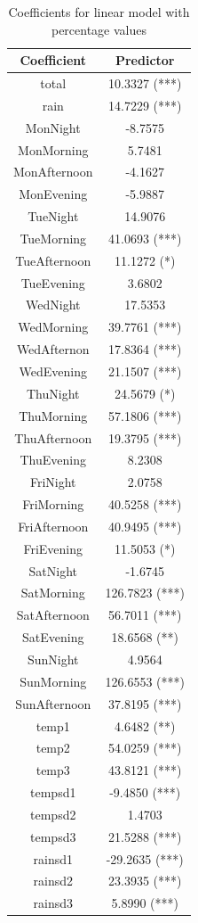 \documentclass[twoside,11pt]{article}
\begin{document}
\begin{table}[H]
    \centering
    \begin{tabular}{c|c}
        Coefficient & Predictor \\ 
        \hline
        \hline
        total & 10.3327 (***) \\
        rain & 14.7229 (***) \\
        MonNight & -8.7575 \\
        MonMorning & 5.7481 \\
        MonAfternoon & -4.1627 \\
        MonEvening & -5.9887 \\
        TueNight & 14.9076 \\
        TueMorning & 41.0693 (***) \\
        TueAfternoon & 11.1272 (*)\\
        TueEvening & 3.6802 \\
        WedNight & 17.5353 \\
        WedMorning & 39.7761 (***) \\
        WedAfternon & 17.8364 (***) \\
        WedEvening & 21.1507 (***) \\
        ThuNight & 24.5679 (*) \\
        ThuMorning & 57.1806 (***) \\
        ThuAfternoon & 19.3795 (***) \\
        ThuEvening & 8.2308 \\
        FriNight & 2.0758\\
        FriMorning & 40.5258 (***) \\
        FriAfternoon & 40.9495 (***) \\
        FriEvening & 11.5053 (*) \\
        SatNight & -1.6745 \\
        SatMorning & 126.7823 (***) \\
        SatAfternoon & 56.7011 (***) \\
        SatEvening & 18.6568 (**) \\
        SunNight &  4.9564 \\
        SunMorning & 126.6553 (***) \\
        SunAfternoon & 37.8195 (***) \\
        temp1 & 4.6482 (**) \\
        temp2 & 54.0259 (***) \\
        temp3 & 43.8121 (***) \\
        tempsd1 & -9.4850 (***) \\
        tempsd2 & 1.4703 \\
        tempsd3 & 21.5288 (***) \\
        rainsd1 & -29.2635 (***) \\
        rainsd2 & 23.3935 (***) \\
        rainsd3 & 5.8990 (***) \\
    \end{tabular}
    \caption{Coefficients for linear model with percentage values}
    \label{tab:coefficients_perc}
\end{table}
\end{document}
